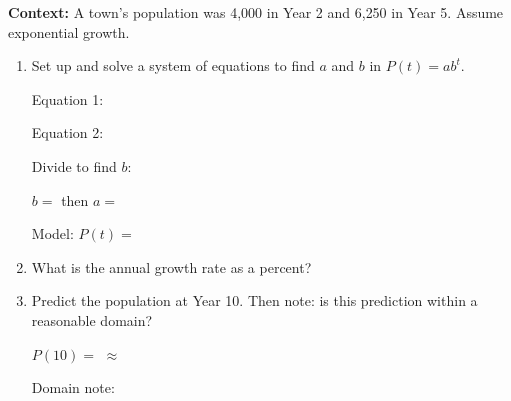 \documentclass[10pt]{article}
\begin{document}
\vspace{0.1in}

\begin{tcolorbox}[colback=white, colframe=black!40,
    title=\textbf{Tier A --- Apply},
    fonttitle=\bfseries, arc=2mm, left=3mm, right=3mm, top=2mm, bottom=2mm]

\textbf{Context:} A town's population was 4{,}000 in Year 2 and 6{,}250 in Year 5.
Assume exponential growth.

\begin{enumerate}[itemsep=10pt]
  \item Set up and solve a system of equations to find $a$ and $b$ in $P(t) = ab^t$.

        \vspace{0.06in}
        Equation 1: 

        Equation 2: 

        Divide to find $b$: 

        \vspace{0.04in}
        $b = $  \quad then $a = $ 

        \vspace{0.04in}
        Model: $P(t) = $ 

  \item What is the annual growth rate as a percent? 

  \item Predict the population at Year 10. Then note: is this prediction within a reasonable domain?

        \vspace{0.06in}
        $P(10) = $  $\approx$ 

        \vspace{0.04in}
        Domain note: 
\end{enumerate}
\end{tcolorbox}

\vspace{0.1in}
\end{document}
